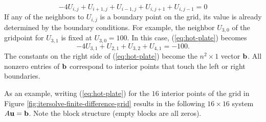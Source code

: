 \begin{equation}
-4U_{i,j} + U_{i+1,j} + U_{i-1,j} + U_{i,j+1} +  U_{i,j-1} = 0
\label{eq:hot-plate}
\end{equation}
If any of the neighbors to $U_{i,j}$ is a boundary point on the grid, its value is already determined by the boundary conditions.
For example, the neighbor $U_{3,0}$ of the gridpoint for $U_{3,1}$ is fixed at $U_{3,0} = 100$.
In this case, (\ref{eq:hot-plate}) becomes
\[
-4U_{3,1} + U_{2,1} + U_{3,2} + U_{4,1} = -100.
\]
The constants on the right side of (\ref{eq:hot-plate}) become the $n^2\times 1$ vector $\mathbf{b}$.
All nonzero entries of $\mathbf{b}$ correspond to interior points that touch the left or right boundaries.

As an example, writing (\ref{eq:hot-plate}) for the $16$ interior points of the grid in Figure \ref{fig:itersolve-finite-difference-grid} results in the following $16 \times 16$ system $A\mathbf{u} = \mathbf{b}$.
Note the block structure (empty blocks are all zeros).
\footnotesize
